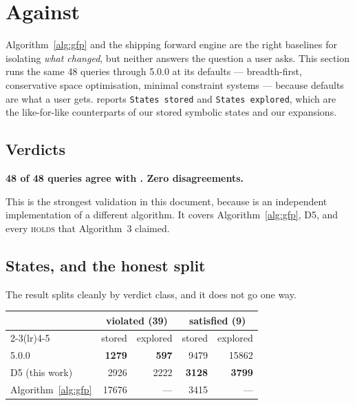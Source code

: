 \section{Against \uppaal{}}
\label{sec:otf:uppaal}

Algorithm~\ref{alg:gfp} and the shipping forward engine are the right baselines for isolating
\emph{what changed}, but neither answers the question a user asks. This section runs the same 48
queries through \verifyta{} 5.0.0 at its defaults --- breadth-first, conservative space
optimisation, minimal constraint systems --- because defaults are what a user gets. \verifyta{}
reports \texttt{States stored} and \texttt{States explored}, which are the like-for-like
counterparts of our stored symbolic states and our expansions.

\subsection{Verdicts}

\begin{center}
\textbf{48 of 48 queries agree with \verifyta{}. Zero disagreements.} \measured{}
\end{center}

This is the strongest validation in this document, because \verifyta{} is an independent
implementation of a different algorithm. It covers Algorithm~\ref{alg:gfp}, D5, and every
\textsc{holds} that Algorithm~3 claimed.

\subsection{States, and the honest split}

The result splits cleanly by verdict class, and it does not go one way.

\begin{center}
\begin{tabular}{@{}lrrrr@{}}
\toprule
 & \multicolumn{2}{c}{violated (39)} & \multicolumn{2}{c}{satisfied (9)} \\
\cmidrule(lr){2-3}\cmidrule(lr){4-5}
 & stored & explored & stored & explored \\
\midrule
\verifyta{} 5.0.0            & \textbf{1279} & \textbf{597}  & 9479 & 15862 \\
D5 (this work)               & 2926 & 2222 & \textbf{3128} & \textbf{3799} \\
Algorithm~\ref{alg:gfp}      & 17676 & --- & 3415 & --- \\
\bottomrule
\end{tabular}
\end{center}


